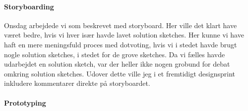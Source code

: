 \documentclass{article}
\begin{document}
\paragraph{Storyboarding} Onsdag arbejdede vi som beskrevet med storyboard. Her
ville det klart have været bedre, hvis vi hver især havde lavet solution
sketches. Her kunne vi have haft en mere meningsfuld proces med dotvoting, hvis
vi i stedet havde brugt nogle solution sketches, i stedet for de grove sketches.
Da vi fælles havde udarbejdet en solution sketch, var der heller ikke nogen
grobund for debat omkring solution sketches.  Udover dette ville jeg i et
fremtidigt designsprint inkludere kommentarer direkte på storyboardet.

\paragraph{Prototyping}
\end{document}
